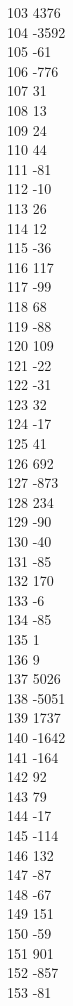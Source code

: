 { 103	4376 \\
 104	-3592 \\
 105	-61 \\
 106	-776 \\
 107	31 \\
 108	13 \\
 109	24 \\
 110	44 \\
 111	-81 \\
 112	-10 \\
 113	26 \\
 114	12 \\
 115	-36 \\
 116	117 \\
 117	-99 \\
 118	68 \\
 119	-88 \\
 120	109 \\
 121	-22 \\
 122	-31 \\
 123	32 \\
 124	-17 \\
 125	41 \\
 126	692 \\
 127	-873 \\
 128	234 \\
 129	-90 \\
 130	-40 \\
 131	-85 \\
 132	170 \\
 133	-6 \\
 134	-85 \\
 135	1 \\
 136	9 \\
 137	5026 \\
 138	-5051 \\
 139	1737 \\
 140	-1642 \\
 141	-164 \\
 142	92 \\
 143	79 \\
 144	-17 \\
 145	-114 \\
 146	132 \\
 147	-87 \\
 148	-67 \\
 149	151 \\
 150	-59 \\
 151	901 \\
 152	-857 \\
 153	-81 \\
}
